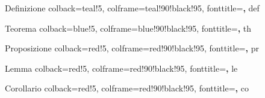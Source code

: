 \usepackage[italian]{babel}
\usepackage{amsfonts}
\usepackage{amssymb}
\usepackage{tikz}
\usetikzlibrary{cd}
\usepackage{extarrows}
\usepackage{mathrsfs}
\usepackage{amsthm}

\usepackage{tcolorbox}
\usepackage{hyperref}
\usepackage{graphicx}
\graphicspath{ {./Immagini/} }
\usepackage{bm}
\usepackage{fouriernc}
\usepackage[T1]{fontenc}
\usepackage{tikzrput}
\usepackage[object=vectorian]{pgfornament}
\usepackage{xcolor}
\usepackage{fourier-orns}
\usepackage{fancyhdr}
\renewcommand{\headrule}{%
\vspace{-8pt}\hrulefill
\raisebox{-2.1pt}{\quad\decofourleft\decotwo\decofourright\quad}\hrulefill}
\usetikzlibrary{cd,decorations.pathmorphing,patterns}
\usepackage[T1]{fontenc}


	{Definizione}%
	{%
		colback=teal!5,
		colframe=teal!90!black!95,
		fonttitle=\bfseries,
	}%
	{def}%

	{Teorema}%
	{%
		colback=blue!5,
		colframe=blue!90!black!95,
		fonttitle=\bfseries,
	}%
	{th}%

	{Proposizione}%
	{%
		colback=red!5,
		colframe=red!90!black!95,
		fonttitle=\bfseries,
	}%
	{pr}%

	{Lemma}%
	{%
		colback=red!5,
		colframe=red!90!black!95,
		fonttitle=\bfseries,
	}%
	{le}%

	{Corollario}%
	{%
		colback=red!5,
		colframe=red!90!black!95,
		fonttitle=\bfseries,
	}%
	{co}%

\newcommand{\vareps}{\varepsilon}
\newtheorem{es}{Esempio}
\theoremstyle{definition}
\newtheorem*{oss}{Osservazione}
\newtheorem{ese}{Esercizio}

\newenvironment{sol}
	{\renewcommand\qedsymbol{$\blacksquare$}\begin{proof}[Soluzione]}
	{\end{proof}}

